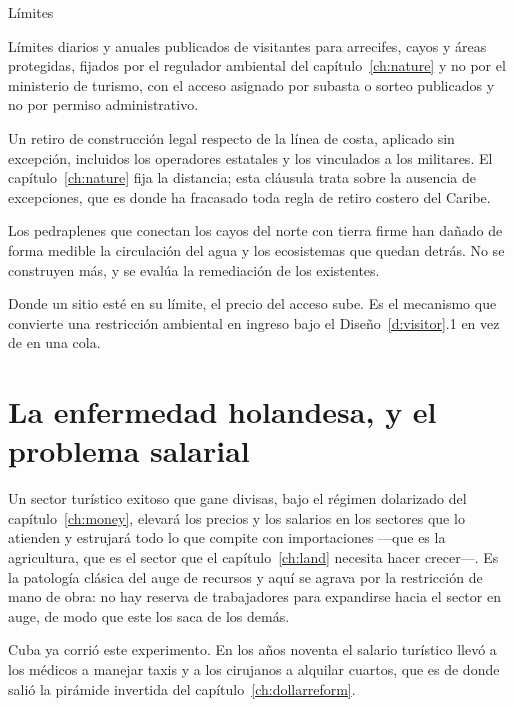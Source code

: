\begin{design}{Límites}
\label{d:limits}
\begin{rules}
 Límites diarios y anuales publicados de visitantes para arrecifes,
cayos y áreas protegidas, fijados por el regulador ambiental del capítulo~\ref{ch:nature} y
no por el ministerio de turismo, con el acceso asignado por subasta o sorteo publicados y no
por permiso administrativo.

 Un retiro de construcción legal respecto de la línea de costa,
aplicado sin excepción, incluidos los operadores estatales y los vinculados a los militares.
El capítulo~\ref{ch:nature} fija la distancia; esta cláusula trata sobre la ausencia de
excepciones, que es donde ha fracasado toda regla de retiro costero del Caribe.

 Los pedraplenes que conectan los cayos del norte con tierra
firme han dañado de forma medible la circulación del agua y los ecosistemas que quedan
detrás. No se construyen más, y se evalúa la remediación de los existentes.

 Donde un sitio esté en su límite, el precio del acceso
sube. Es el mecanismo que convierte una restricción ambiental en ingreso bajo el
Diseño~\ref{d:visitor}.1 en vez de en una cola.
\end{rules}
\end{design}

\section{La enfermedad holandesa, y el problema salarial}

Un sector turístico exitoso que gane divisas, bajo el régimen dolarizado del
capítulo~\ref{ch:money}, elevará los precios y los salarios en los sectores que lo atienden y
estrujará todo lo que compite con importaciones ---que es la agricultura, que es el sector
que el capítulo~\ref{ch:land} necesita hacer crecer---. Es la patología clásica del auge de
recursos y aquí se agrava por la restricción de mano de obra: no hay reserva de trabajadores
para expandirse hacia el sector en auge, de modo que este los saca de los demás.

Cuba ya corrió este experimento. En los años noventa el salario turístico llevó a los médicos
a manejar taxis y a los cirujanos a alquilar cuartos, que es de donde salió la pirámide
invertida del capítulo~\ref{ch:dollarreform}.

